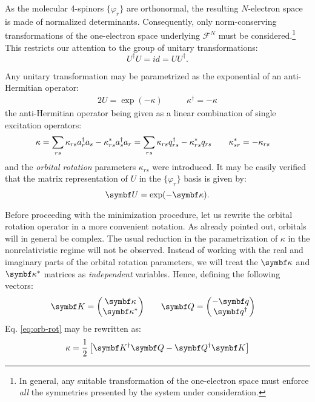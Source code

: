 As the molecular 4-spinors $\lbrace\varphi_r\rbrace$ are orthonormal,
the resulting $N$-electron space is made of normalized determinants.
Consequently, only norm-conserving transformations of the one-electron
space underlying $\mathcal{F}^N$ must be considered.\footnote{In
general, any suitable transformation of the one-electron space must
enforce \emph{all} the symmetries presented by the system under
consideration.}
This restricts our attention to the group of unitary transformations:
\begin{equation}
 U^\dagger U = id = UU^\dagger.
\end{equation}

Any unitary transformation may be parametrized as the exponential of an
anti-Hermitian operator:\autocite{Arfken2013-pt, Helgaker2000-tz}
\begin{alignat}{2}
 U = \exp(-\kappa) \quad&\quad \kappa^\dagger = -\kappa
\end{alignat}
the anti-Hermitian operator being given as a linear combination of
single excitation operators:
\begin{alignat}{2}\label{eq:orb-rot}
  \kappa = \sum_{rs} \kappa_{rs} a_{r}^{\dagger}a_{s} -\kappa^*_{rs}a_{s}^{\dagger}a_{r}
= \sum_{rs}\kappa_{rs}q^\dagger_{rs} - \kappa^*_{rs}q_{rs}
\quad&\quad \kappa_{sr}^* = -\kappa_{rs}
\end{alignat}
and the \emph{orbital rotation} parameters $\kappa_{rs}$ were introduced.
It may be easily verified that the matrix representation of $U$ in the
$\lbrace\varphi_{r}\rbrace$ basis is given by:
\begin{equation}
 \mat{U} = \exp(-\vect{\kappa}).
\end{equation}

Before proceeding with the minimization procedure, let us rewrite the
orbital rotation operator in a more convenient notation. As already
pointed out, orbitals will in general be complex. The usual reduction in
the parametrization of $\kappa$ in the nonrelativistic regime will not
be observed. Instead of working with the real and imaginary parts of the
orbital rotation parameters, we will treat the $\vect{\kappa}$ and
$\vect{\kappa}^*$ matrices as \emph{independent} variables. Hence,
defining the following vectors:
\begin{alignat}{2}
\vect{K} =
 \begin{pmatrix}
  \vect{\kappa} \\
  \vect{\kappa}^*
 \end{pmatrix}
\quad&\quad
\vect{Q} =
 \begin{pmatrix}
  -\vect{q} \\
  \vect{q}^\dagger
 \end{pmatrix}
\end{alignat}
Eq. \eqref{eq:orb-rot} may be rewritten as:
\begin{equation}\label{eq:orb-rot-new}
  \kappa = \frac{1}{2}\left[ \vect{K}^\dagger\vect{Q} - \vect{Q}^\dagger\vect{K}\right]
\end{equation}

